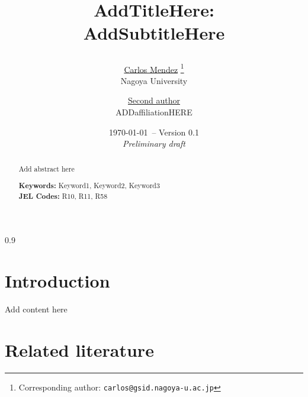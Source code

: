 \documentclass[12pt,twoside]{article}
\begin{document}
\begin{spacing}{0.9}
\begin{titlepage}

\title{
\textbf{ 
AddTitleHere: \\
}
AddSubtitleHere

}



\author{
  \large \href{https://carlos-mendez.rbind.io}{Carlos Mendez} 
  \thanks{Corresponding author: \texttt{carlos@gsid.nagoya-u.ac.jp}}
  \\
  Nagoya University
  \and
  \large \href{https://quarcs-lab.org}{Second author} 
  \\
  ADDaffiliationHERE
}

\date{\small \today \ -- Version 0.1\\ {\it Preliminary draft}}
\maketitle
\thispagestyle{empty}

\vspace{-0.3in}

\begin{abstract}
Add abstract here

\vspace{0.5cm}

\noindent \textbf{Keywords:} Keyword1, Keyword2, Keyword3 \\

\noindent  \textbf{JEL Codes:}  R10, R11, R58   

\end{abstract}

\end{titlepage}
\end{spacing}


\section{Introduction}

Add content here


\section{Related literature}
\end{document}
